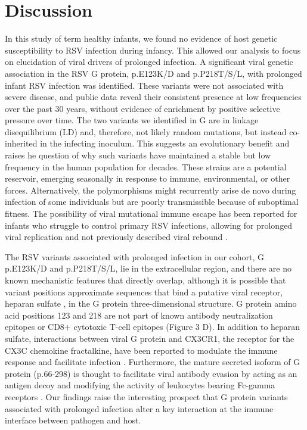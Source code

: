\documentclass{article} %
\begin{document}
\section{Discussion}
In this study of term healthy infants, we found no evidence of host genetic susceptibility to RSV infection during infancy. This allowed our analysis to focus on elucidation of viral drivers of prolonged infection. A significant viral genetic association in the RSV G protein, p.E123K/D and p.P218T/S/L, with prolonged infant RSV infection was identified. These variants were not associated with severe disease, and public data reveal their consistent presence at low frequencies over the past 30 years, without evidence of enrichment by positive selective pressure over time. The two variants we identified in G are in linkage disequilibrium (LD) and, therefore, not likely random mutations, but instead co-inherited in the infecting inoculum. This suggests an evolutionary benefit and raises he question of why such variants have maintained a stable but low frequency in the human population for decades. These strains are a potential reservoir, emerging seasonally in response to immune, environmental, or other forces. Alternatively, the polymorphisms might recurrently arise de novo during infection of some individuals but are poorly transmissible because of suboptimal fitness. The possibility of viral mutational immune escape has been reported for infants who struggle to control primary RSV infections, allowing for prolonged viral replication and not previously described viral rebound 
\citep{brint2017prolonged}.

The RSV variants associated with prolonged infection in our cohort, G p.E123K/D and p.P218T/S/L, lie in the extracellular region, and there are no known mechanistic features that directly overlap, although it is possible that variant positions approximate sequences that bind a putative viral receptor, heparan sulfate 
\citep{feldman1999identification}, in the G protein three-dimensional structure. G protein amino acid positions 123 and 218 are not part of known antibody neutralization epitopes or CD8+ cytotoxic T-cell epitopes (Figure 3 D). In addition to heparan sulfate, interactions between viral G protein and CX3CR1, the receptor for the CX3C chemokine fractalkine, have been reported to modulate the immune response and facilitate infection 
\citep{levine1987demonstration, feldman1999identification, feldman2000fusion, johnson2015respiratory, tripp2001cx3c, jeong2015cx3cr1}.
Furthermore, the mature secreted isoform of G protein (p.66-298) is thought to facilitate viral antibody evasion by acting as an antigen decoy and modifying the activity of leukocytes bearing Fc-gamma receptors 
\citep{bukreyev2008secreted}. 
Our findings raise the interesting prospect that G protein variants associated with prolonged infection alter a key interaction at the immune interface between pathogen and host.
\end{document}

